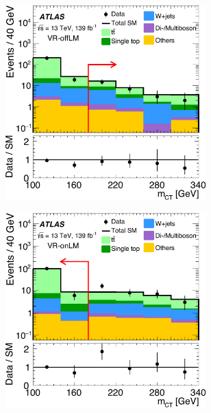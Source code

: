  \begin{figure}
	\centering
	\begin{subfigure}[b]{0.5\linewidth}
		\centering\includegraphics[width=0.85\textwidth]{OneLeptonbb_VR_UnderFlowBin_VRtt1offnomct2EM_mct2_yellow}
	\end{subfigure}\hfill
	\begin{subfigure}[b]{0.5\linewidth}
		\centering\includegraphics[width=0.85\textwidth]{OneLeptonbb_VR_UnderFlowBin_VRtt1onnomct2EM_mct2_yellow}
	\end{subfigure}\hfill
	\par\medskip

\end{figure}
